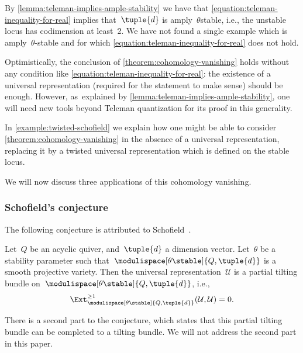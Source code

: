 \begin{remark}
\label{remark:ample-stability}
By \cref{lemma:teleman-implies-ample-stability}
we have that \eqref{equation:teleman-inequality-for-real}
implies that~$\tuple{d}$ is amply~$\theta$\dash stable,
i.e., the unstable locus has codimension at least~2.
We have not found a single example which is amply~$\theta$-stable
and for which \eqref{equation:teleman-inequality-for-real} does not hold.

Optimistically, the conclusion of \cref{theorem:cohomology-vanishing} holds
without any condition like \eqref{equation:teleman-inequality-for-real}:
the existence of a universal representation (required for the statement to make sense)
should be enough.
However, as~explained by \cref{lemma:teleman-implies-ample-stability},
one will need new tools beyond Teleman quantization for its proof in this generality.
\end{remark}

\begin{remark}
In \cref{example:twisted-schofield}
we explain how one might be able to consider \cref{theorem:cohomology-vanishing}
in the absence of a universal representation,
replacing it by a twisted universal representation
which is defined on the stable locus.
\end{remark}

We will now discuss three applications of this cohomology vanishing.

\subsubsection*{Schofield's conjecture}
The following conjecture is attributed to Schofield~\cite[p.\,80]{MR1428456}.
\begin{alphaconjecture}[Schofield]
\label{conjecture:schofield}
Let~$Q$ be an acyclic quiver,
and~$\tuple{d}$ a dimension vector.
Let~$\theta$ be a stability parameter
such that~$\modulispace[\theta\stable]{Q,\tuple{d}}$
is a smooth projective variety.
Then the universal representation~$\mathcal{U}$
is a partial tilting bundle on~$\modulispace[\theta\stable]{Q,\tuple{d}}$,
i.e.,
\begin{equation*}
\Ext_{\modulispace[\theta\stable]{Q,\tuple{d}}}^{\geq 1}(\mathcal{U},\mathcal{U})=0.
\end{equation*}
\end{alphaconjecture}
There is a second part to the conjecture,
which states that
this partial tilting bundle can be completed to a tilting bundle.
We will not address the second part in this paper.

